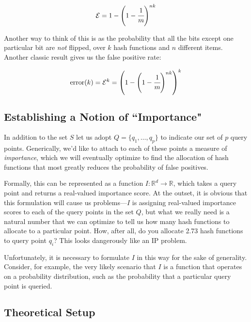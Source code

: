 \documentclass[11pt]{article}
\begin{document}
\begin{equation}
\mathcal{E} = 1 - \left(1 - \cfrac{1}{m} \right)^{nk}
\end{equation}

Another way to think of this is as the probability that all the bits except one particular bit are \textit{not} flipped, over $k$ hash functions and $n$ different items. Another classic result gives us the false positive rate:

\begin{equation}
\text{error}(k) = \mathcal{E}^k = \left( 1 - \left( 1 - \cfrac{1}{m} \right)^{nk} \right)^k
\end{equation}

\subsection{Establishing a Notion of ``Importance"}

In addition to the set $S$ let us adopt $Q = \{ q_1, \ldots, q_p \}$ to indicate our set of $p$ query points. Generically, we'd like to attach to each of these points a measure of \textit{importance}, which we will eventually optimize to find the allocation of hash functions that most greatly reduces the probability of false positives.

Formally, this can be represented as a function $I : \mathbb{R}^d \rightarrow \mathbb{R}$, which takes a query point and returns a real-valued importance score. At the outset, it is obvious that this formulation will cause us problems---$I$ is assigning real-valued importance scores to each of the query points in the set $Q$, but what we really need is a natural number that we can optimize to tell us how many hash functions to allocate to a particular point. How, after all, do you allocate 2.73 hash functions to query point $q_i$? This looks dangerously like an IP problem.

Unfortunately, it is necessary to formulate $I$ in this way for the sake of generality. Consider, for example, the very likely scenario that $I$ is a function that operates on a probability distribution, such as the probability that a particular query point is queried.

\subsection{Theoretical Setup}
\end{document}
